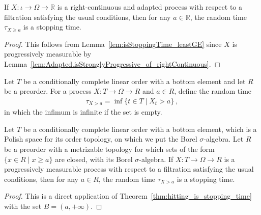 \begin{corollary}\label{cor:isStoppingTime_leastGE_of_rightContinuous}
If $X : ι \to Ω \to ℝ$ is a right-continuous and adapted process with respect to a filtration satisfying the usual conditions, then for any $a \in \mathbb{R}$, the random time $\tau_{X \ge a}$ is a stopping time.
\end{corollary}

\begin{proof}
This follows from Lemma~\ref{lem:isStoppingTime_leastGE} since $X$ is progressively measurable by Lemma~\ref{lem:Adapted.isStronglyProgressive_of_rightContinuous}.
\end{proof}


\begin{definition}\label{def:leastGT}
  \leanok
Let $T$ be a conditionally complete linear order with a bottom element and let $R$ be a preorder.
For a process $X : T \to Ω \to R$ and $a \in R$, define the random time
\begin{align*}
  \tau_{X > a} = \inf\{t \in T \mid X_t > a\} \: ,
\end{align*}
in which the infimum is infinite if the set is empty.
\end{definition}


\begin{lemma}\label{lem:isStoppingTime_leastGT}
  \leanok
Let $T$ be a conditionally complete linear order with a bottom element, which is a Polish space for its order topology, on which we put the Borel $\sigma$-algebra.
Let $R$ be a preorder with a metrizable topology for which sets of the form $\{x \in R \mid x \ge a\}$ are closed, with its Borel $\sigma$-algebra.
If $X : T \to Ω \to R$ is a progressively measurable process with respect to a filtration satisfying the usual conditions, then for any $a \in R$, the random time $\tau_{X > a}$ is a stopping time.
\end{lemma}

\begin{proof}\leanok
This is a direct application of Theorem~\ref{thm:hitting_is_stopping_time} with the set $B = (a, +\infty)$.
\end{proof}



